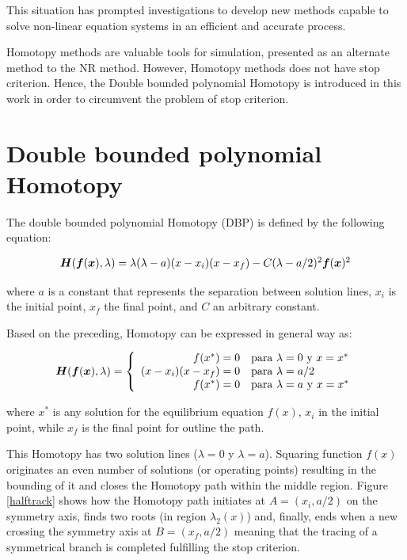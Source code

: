 \documentclass[conference,letterpaper,onecolumn]{IEEEtran}
\newcommand{\pig}[1]{\mbox{\boldmath ${#1}$}	}
\begin{document}
This situation has prompted investigations to develop new methods capable to solve non-linear equation systems in an efficient and accurate process.

Homotopy methods \cite{BHLHOM,homo_ArtificialP} are valuable tools for simulation, presented as an alternate method to the NR method. However, Homotopy methods does not have stop criterion. Hence, the Double bounded polynomial Homotopy is introduced in this work in order to circumvent the problem of stop criterion.


\section{Double bounded polynomial Homotopy}

The double bounded polynomial Homotopy (DBP) is defined by the following equation:

\begin{equation}
{\small
\begin{array}{l}
\pig{H}(\pig{f}(\pig{x}),\lambda )=\lambda(\lambda-a)(x-x_i)(x-x_f) -C(\lambda-a/2)^2 \pig{f}(\pig{x})^2
\end{array}}
\label{homotopiaP}
\end{equation}

where $a$ is a constant that represents the separation between solution lines, $x_i$ is the initial point, $x_f$ the final point, and $C$ an arbitrary constant.

Based on the preceding, Homotopy can be expressed in general way as:

\begin{displaymath}
\pig{H}(\pig{f}(\pig{x}),\lambda ) = \left\{\begin{array}{rl}
f(x^*)=0 & \textrm{para $\lambda=0$ y $x=x^*$}\\
(x-x_i)(x-x_f)=0 & \textrm{para $\lambda=a/2$}\\
f(x^*)=0 & \textrm{para $\lambda=a$ y $x=x^*$}
\end{array}\right.
\end{displaymath}

where $x^*$ is any solution for the equilibrium equation $f(x)$, $x_i$ in the initial point, while $x_f$ is the final point for outline the path.

This Homotopy has two solution lines ($\lambda=0$ y $\lambda=a$). Squaring function $f(x)$ originates an even number of solutions (or operating points) resulting in the bounding of it and closes the Homotopy path within the middle region. Figure \ref{halftrack} shows how the Homotopy path initiates at $A=(x_i,a/2)$ on the symmetry axis, finds two roots (in region $\lambda_2(x)$) and, finally, ends when a new crossing the symmetry axis at $B=(x_f,a/2)$ meaning that the tracing of a symmetrical branch is completed fulfilling the stop criterion.
\end{document}
